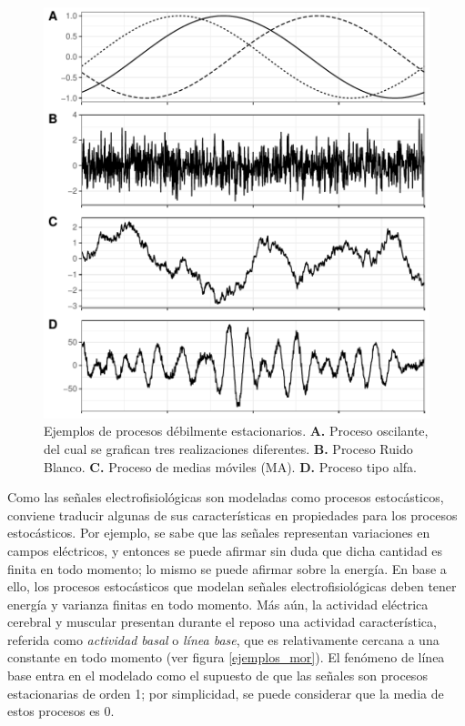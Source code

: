 \begin{figure}
\centering
\includegraphics[width=\linewidth]{./img_mas_ejemplos/ruidos_ejemplos.pdf}
\caption[Ejemplos de procesos débilmente estacionarios]{Ejemplos de procesos débilmente estacionarios. \textbf{A.} Proceso oscilante, del cual se grafican tres realizaciones diferentes. \textbf{B.} Proceso Ruido Blanco. \textbf{C.} Proceso de medias móviles (MA). \textbf{D.} Proceso tipo alfa. }
\end{figure}

Como las señales electrofisiológicas son modeladas como procesos estocásticos, conviene traducir algunas de sus características en propiedades para los procesos estocásticos.
%
Por ejemplo, se sabe que las señales representan variaciones en campos eléctricos, y entonces se puede afirmar sin duda que dicha cantidad es finita en todo momento; lo mismo se puede afirmar sobre la energía.
%
En base a ello, los procesos estocásticos que modelan señales electrofisiológicas deben tener energía y varianza finitas en todo momento.
%
Más aún, la actividad eléctrica cerebral y muscular presentan durante el reposo una actividad característica, referida como \textit{actividad basal} o \textit{línea base}, que es relativamente cercana a una constante en todo momento (ver figura \ref{ejemplos_mor}).
%
El fenómeno de línea base entra en el modelado como el supuesto de que las señales son procesos estacionarias de orden 1; por simplicidad, se puede considerar que la media de estos procesos es 0.

